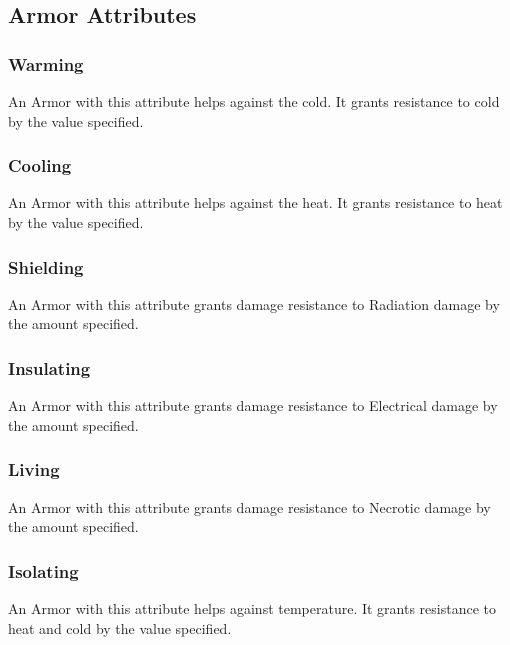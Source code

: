 \subsection{Armor Attributes}\label{subsec:armorAttributes}

\subsubsection{Warming}\label{armor:warming}
An Armor with this attribute helps against the cold.
It grants resistance to cold by the value specified.

\subsubsection{Cooling}\label{armor:cooling}
An Armor with this attribute helps against the heat.
It grants resistance to heat by the value specified.

\subsubsection{Shielding}\label{armor:shielding}
An Armor with this attribute grants damage resistance to Radiation damage by the amount specified.

\subsubsection{Insulating}\label{armor:insulating}
An Armor with this attribute grants damage resistance to Electrical damage by the amount specified.

\subsubsection{Living}\label{armor:living}
An Armor with this attribute grants damage resistance to Necrotic damage by the amount specified.

\subsubsection{Isolating}\label{armor:isolating}
An Armor with this attribute helps against temperature.
It grants resistance to heat and cold by the value specified.

